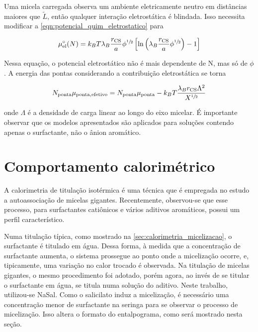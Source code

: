 		Uma micela carregada observa um ambiente eletricamente neutro em distâncias maiores que \(\tilde{L}\), então qualquer interação eletrostática é blindada. Isso necessita modificar a \autoref{eqn:potencial_quim_eletrostatico} para \cite{Giant_Micelles}
		
		\begin{equation}
			\mu_\mathrm{el}^\circ(N) = k_B T \lambda_B \dfrac{r_\mathrm{CS}}{a} \phi^{\sfrac{1}{2}} \left[ \ln \left( \lambda_B \dfrac{r_\mathrm{CS}}{a} \phi^{\sfrac{1}{2}} \right) - 1 \right]
			\label{eqn:potencial_eletrostatico_semidiluido}
		\end{equation}
		
		Nessa equação, o potencial eletrostático não é mais dependente de N, mas só de \(\phi\). A energia das pontas considerando a contribuição eletrostática se torna \cite{Giant_Micelles}
		
		\begin{equation}
			N_\mathrm{ponta}\mu_\mathrm{ponta, efetivo} = N_\mathrm{ponta}\mu_\mathrm{ponta} - k_B T \dfrac{\lambda_B r_\mathrm{CS} \Lambda^2}{X^{\sfrac{1}{2}}}
		\end{equation} 
		
		\noindent onde \(\Lambda\) é a densidade de carga linear ao longo do eixo micelar. É importante observar que os modelos apresentados são aplicados para soluções contendo apenas o surfactante, não o ânion aromático.
		

		\section{Comportamento calorimétrico} 
		\label{sec:micelas_gigantes_calorimetria}
		
		A calorimetria de titulação isotérmica é uma técnica que é empregada no estudo a autoassociação de micelas gigantes.\cite{Sarac2009, Sarac2013, Liu2011a, Bijma1998c, Fisicaro2005a} Recentemente, observou-se que esse processo, para surfactantes catiônicos e vários aditivos aromáticos, possui um perfil característico.\cite{Ito2016, Ito2015c}

		Numa titulação típica, como mostrado na \autoref{sec:calorimetria_micelizacao}, o surfactante é titulado em água. Dessa forma, à medida que a concentração de surfactante aumenta, o sistema prossegue ao ponto onde a micelização ocorre, e, tipicamente, uma variação no calor trocado é observada. Na titulação de micelas gigantes, o mesmo procedimento foi adotado, porém agora, ao invés de se titular o surfactante em água, se titula numa solução do aditivo. Neste trabalho, utilizou-se NaSal. Como o salicilato induz a micelização, é necessário uma concentração menor de surfactante na seringa para se observar o processo de micelização. Isso altera o formato do entalpograma, como será mostrado nesta seção.
		
